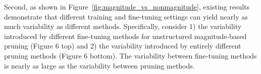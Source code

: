 \vspace{2mm}
Second, as shown in Figure~\ref{fig:magnitude_vs_nonmagnitude}, existing results demonstrate that different training and fine-tuning settings can yield nearly as much variability as different methods. Specifically, consider 1) the variability introduced by different fine-tuning methods for unstructured magnitude-based pruning (Figure 6 top) and 2) the variability introduced by entirely different pruning methods (Figure 6 bottom). The variability between fine-tuning methods is nearly as large as the variability between pruning methods.
